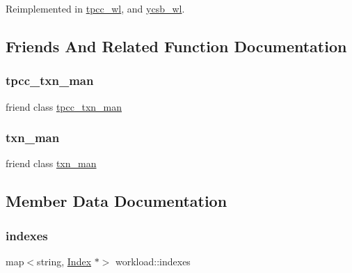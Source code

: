 Reimplemented in \hyperlink{classtpcc__wl_ac89b938cbaf311844d79f3946df49005}{tpcc\+\_\+wl}, and \hyperlink{classycsb__wl_aba11708593028b3cea7986adb280aae3}{ycsb\+\_\+wl}.



\subsection{Friends And Related Function Documentation}
\mbox{\label{classworkload_a7e57327617727745c74d4598cc485212}} 
\subsubsection{\texorpdfstring{tpcc\+\_\+txn\+\_\+man}{tpcc\_txn\_man}}
{\footnotesize\ttfamily friend class \hyperlink{classtpcc__txn__man}{tpcc\+\_\+txn\+\_\+man}\hspace{0.3cm}{\ttfamily [friend]}}

\mbox{\label{classworkload_a128ce032b45a6a15c2dc63fe34da7d42}} 
\subsubsection{\texorpdfstring{txn\+\_\+man}{txn\_man}}
{\footnotesize\ttfamily friend class \hyperlink{classtxn__man}{txn\+\_\+man}\hspace{0.3cm}{\ttfamily [friend]}}



\subsection{Member Data Documentation}
\mbox{\label{classworkload_a7b0952cf3cecba206343b2b22ee67ee9}} 
\subsubsection{\texorpdfstring{indexes}{indexes}}
{\footnotesize\ttfamily map$<$string, \hyperlink{classIndex}{Index} $\ast$$>$ workload\+::indexes}

